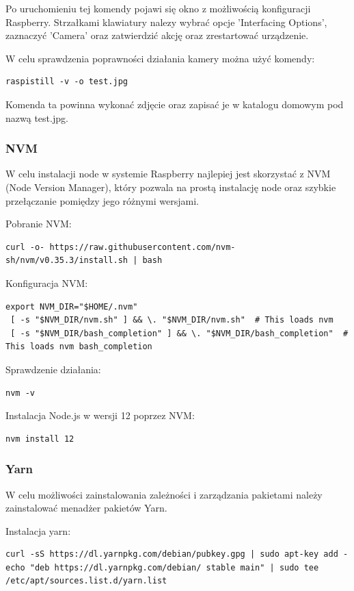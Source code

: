 Po uruchomieniu tej komendy pojawi się okno z możliwością konfiguracji Raspberry. Strzałkami klawiatury nalezy wybrać opcje 'Interfacing Options',  zaznaczyć 'Camera' oraz zatwierdzić akcję oraz zrestartować urządzenie.

W celu sprawdzenia poprawności działania kamery można użyć komendy:

\begin{lstlisting}
raspistill -v -o test.jpg
\end{lstlisting}

Komenda ta powinna wykonać zdjęcie oraz zapisać je w katalogu domowym pod nazwą test.jpg.

\subsubsection{NVM}

W celu instalacji node w systemie Raspberry najlepiej jest skorzystać z NVM (Node Version Manager), który pozwala na prostą instalację node oraz szybkie przełączanie pomiędzy jego różnymi wersjami.

Pobranie NVM:
\begin{lstlisting}
curl -o- https://raw.githubusercontent.com/nvm-sh/nvm/v0.35.3/install.sh | bash
\end{lstlisting}

Konfiguracja NVM:
\begin{lstlisting}[breaklines=true]
export NVM_DIR="$HOME/.nvm"
 [ -s "$NVM_DIR/nvm.sh" ] && \. "$NVM_DIR/nvm.sh"  # This loads nvm
 [ -s "$NVM_DIR/bash_completion" ] && \. "$NVM_DIR/bash_completion"  # This loads nvm bash_completion
\end{lstlisting}

Sprawdzenie działania:
\begin{lstlisting}
nvm -v
\end{lstlisting}

Instalacja Node.js w wersji 12 poprzez NVM:
\begin{lstlisting}
nvm install 12
\end{lstlisting}

\subsubsection{Yarn}
W celu możliwości zainstalowania zależności i zarządzania pakietami należy zainstalować menadżer pakietów Yarn.

Instalacja yarn:
\begin{lstlisting}[breaklines=true]
curl -sS https://dl.yarnpkg.com/debian/pubkey.gpg | sudo apt-key add -echo "deb https://dl.yarnpkg.com/debian/ stable main" | sudo tee /etc/apt/sources.list.d/yarn.list
\end{lstlisting}

